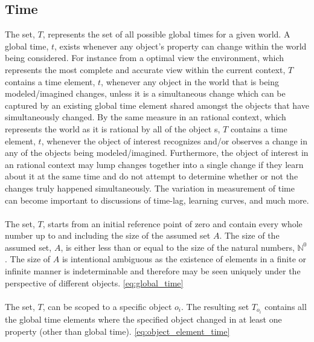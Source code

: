 \documentclass[]{article}
\begin{document}
\subsection*{Time}
The set, $T$, represents the set of all possible global times for a given world. A global time, $t$, exists whenever any object's property can change within the world being considered. For instance from a optimal view the environment, which represents the most complete and accurate view within the current context, $T$ contains a time element, $t$, whenever any object in the world that is being modeled/imagined changes, unless it is a simultaneous change which can be captured by an existing global time element shared amongst the objects that have simultaneously changed. By the same measure in an rational context, which represents the world as it is rational by all of the object s, $T$ contains a time element, $t$, whenever the object of interest recognizes and/or observes a change in any of the objects being modeled/imagined. Furthermore, the object of interest in an rational context may lump changes together into a single change if they learn about it at the same time and do not attempt to determine whether or not the changes truly happened simultaneously. The variation in measurement of time can become important to discussions of time-lag, learning curves, and much more. 
\\
\\
The set, $T$, starts from an initial reference point of zero and contain every whole number up to and including the size of the assumed set $A$. The size of the assumed set, $A$, is either less than or equal to the size of the natural numbers, $\mathbb{N}^{0}$. The size of $A$ is intentional ambiguous as the existence of elements in a finite or infinite manner is indeterminable and therefore may be seen uniquely under the perspective of different objects. \eqref{eq:global_time}
\\
\\ 
The set, $T$, can be scoped to a specific object $o_{i}$. The resulting set $T_{o_{i}}$ contains all the global time elements where the specified object changed in at least one property (other than global time). \eqref{eq:object_element_time}
\end{document}
